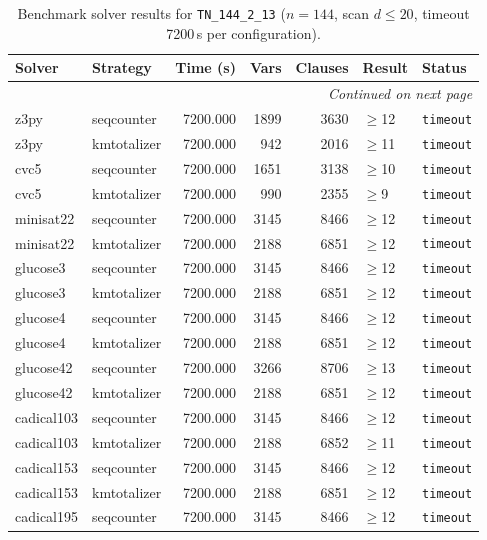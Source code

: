 \begin{longtable}{llrrrl p{}}
\caption{Benchmark solver results for \texttt{TN\_144\_2\_13} ($n=144$, scan $d \leq 20$, timeout 7200\,s per configuration).} \label{tab:bench-TN_144_2_13} \\
\toprule
Solver & Strategy & Time (s) & Vars & Clauses & Result & Status \\
\midrule
\endhead
\midrule
\multicolumn{7}{r}{\textit{Continued on next page}} \\
\midrule
\endfoot
\bottomrule
\endlastfoot
z3py & seqcounter & 7200.000 & 1899 & 3630 & $\geq$12 & \texttt{timeout} \\
z3py & kmtotalizer & 7200.000 & 942 & 2016 & $\geq$11 & \texttt{timeout} \\
cvc5 & seqcounter & 7200.000 & 1651 & 3138 & $\geq$10 & \texttt{timeout} \\
cvc5 & kmtotalizer & 7200.000 & 990 & 2355 & $\geq$9 & \texttt{timeout} \\
minisat22 & seqcounter & 7200.000 & 3145 & 8466 & $\geq$12 & \texttt{timeout} \\
minisat22 & kmtotalizer & 7200.000 & 2188 & 6851 & $\geq$12 & \texttt{timeout} \\
glucose3 & seqcounter & 7200.000 & 3145 & 8466 & $\geq$12 & \texttt{timeout} \\
glucose3 & kmtotalizer & 7200.000 & 2188 & 6851 & $\geq$12 & \texttt{timeout} \\
glucose4 & seqcounter & 7200.000 & 3145 & 8466 & $\geq$12 & \texttt{timeout} \\
glucose4 & kmtotalizer & 7200.000 & 2188 & 6851 & $\geq$12 & \texttt{timeout} \\
glucose42 & seqcounter & 7200.000 & 3266 & 8706 & $\geq$13 & \texttt{timeout} \\
glucose42 & kmtotalizer & 7200.000 & 2188 & 6851 & $\geq$12 & \texttt{timeout} \\
cadical103 & seqcounter & 7200.000 & 3145 & 8466 & $\geq$12 & \texttt{timeout} \\
cadical103 & kmtotalizer & 7200.000 & 2188 & 6852 & $\geq$11 & \texttt{timeout} \\
cadical153 & seqcounter & 7200.000 & 3145 & 8466 & $\geq$12 & \texttt{timeout} \\
cadical153 & kmtotalizer & 7200.000 & 2188 & 6851 & $\geq$12 & \texttt{timeout} \\
cadical195 & seqcounter & 7200.000 & 3145 & 8466 & $\geq$12 & \texttt{timeout} \\

\end{longtable}
